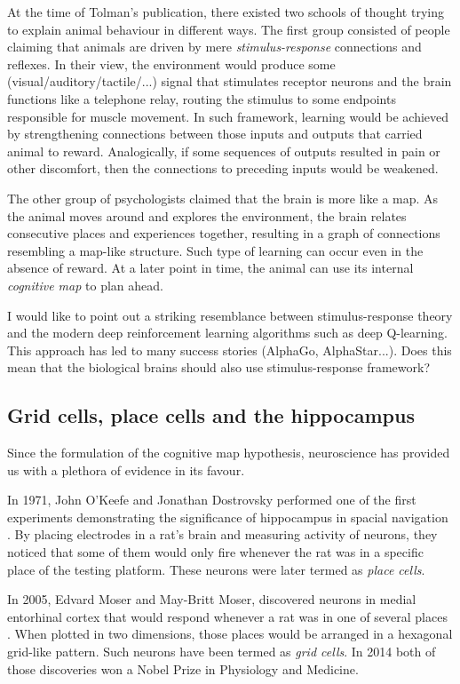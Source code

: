 \documentclass[oneside,english,logo]{amuthesis}
\begin{document}
At the time of Tolman's publication, there existed two schools of thought trying to explain animal behaviour in different ways. The first group consisted of people claiming that animals are driven by mere \textit{stimulus-response} connections and reflexes. In their view, the environment would produce some (visual/auditory/tactile/...) signal that stimulates receptor neurons and the brain functions like a telephone relay, routing the stimulus to some endpoints responsible for muscle movement. In such framework, learning would be achieved by strengthening connections between those inputs and outputs that carried animal to reward. Analogically, if some sequences of outputs resulted in pain or other discomfort, then the connections to preceding inputs would be weakened.

The other group of psychologists claimed that the brain is more like a map. As the animal moves around and explores the environment, the brain relates consecutive places and experiences together, resulting in a graph of  connections resembling a map-like structure. Such type of learning can occur even in the absence of reward. At a later point in time, the animal can use its internal \textit{cognitive map} to plan ahead. 

I would like to point out a striking resemblance between stimulus-response theory and the modern deep reinforcement learning algorithms such as deep Q-learning. This approach has led to many success stories (AlphaGo, AlphaStar...). Does this mean that the biological brains should also use stimulus-response framework?

\subsection{Grid cells, place cells and the hippocampus}
Since the formulation of the cognitive map hypothesis, neuroscience has provided us with a plethora of evidence in its favour.

In 1971, John O'Keefe and Jonathan Dostrovsky performed one of the first experiments demonstrating the significance of hippocampus in spacial navigation \cite{OKEEFE1971171}. By placing electrodes in a rat's brain and measuring activity of neurons, they noticed that some of them would only fire whenever the  rat was in a specific place of the testing platform. These neurons were later termed as \textit{place cells}.

In 2005, Edvard Moser and May-Britt Moser, discovered neurons in medial entorhinal cortex that would respond whenever a rat was in one of several places \cite{Hafting2005}. When plotted in two dimensions, those places would be arranged in a hexagonal grid-like pattern. Such neurons have been termed as \textit{grid cells}. In 2014 both of those discoveries won a Nobel Prize in Physiology and Medicine. 
\end{document}
